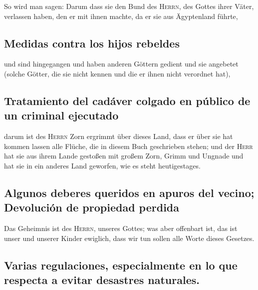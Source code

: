  So wird man sagen: Darum dass sie den Bund des
\textsc{Herrn}, des Gottes ihrer Väter, verlassen haben, den er mit
ihnen machte, da er sie aus Ägyptenland führte,

\hypertarget{medidas-contra-los-hijos-rebeldes}{%
\subsection{Medidas contra los hijos
rebeldes}\label{medidas-contra-los-hijos-rebeldes}}

 und sind hingegangen und haben anderen Göttern gedient
und sie angebetet (solche Götter, die sie nicht kennen und die er ihnen
nicht verordnet hat),

\hypertarget{tratamiento-del-caduxe1ver-colgado-en-puxfablico-de-un-criminal-ejecutado}{%
\subsection{Tratamiento del cadáver colgado en público de un criminal
ejecutado}\label{tratamiento-del-caduxe1ver-colgado-en-puxfablico-de-un-criminal-ejecutado}}

 darum ist des \textsc{Herrn} Zorn ergrimmt über dieses
Land, dass er über sie hat kommen lassen alle Flüche, die in diesem Buch
geschrieben stehen;  und der \textsc{Herr} hat sie aus
ihrem Lande gestoßen mit großem Zorn, Grimm und Ungnade und hat sie in
ein anderes Land geworfen, wie es steht heutigestages.

\hypertarget{algunos-deberes-queridos-en-apuros-del-vecino-devoluciuxf3n-de-propiedad-perdida}{%
\subsection{Algunos deberes queridos en apuros del vecino; Devolución de
propiedad
perdida}\label{algunos-deberes-queridos-en-apuros-del-vecino-devoluciuxf3n-de-propiedad-perdida}}

 Das Geheimnis ist des \textsc{Herrn}, unseres Gottes;
was aber offenbart ist, das ist unser und unserer Kinder ewiglich, dass
wir tun sollen alle Worte dieses Gesetzes.

\hypertarget{varias-regulaciones-especialmente-en-lo-que-respecta-a-evitar-desastres-naturales.}{%
\subsection{Varias regulaciones, especialmente en lo que respecta a
evitar desastres
naturales.}\label{varias-regulaciones-especialmente-en-lo-que-respecta-a-evitar-desastres-naturales.}}

